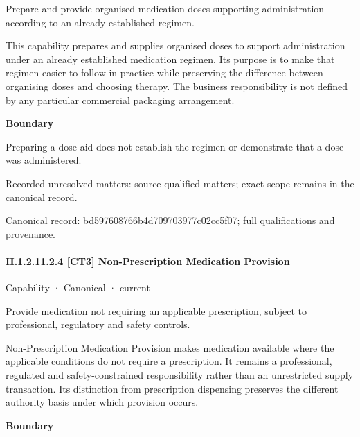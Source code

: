 Prepare and provide organised medication doses supporting administration according to an already established regimen.



This capability prepares and supplies organised doses to support administration under an already established medication regimen. Its purpose is to make that regimen easier to follow in practice while preserving the difference between organising doses and choosing therapy. The business responsibility is not defined by any particular commercial packaging arrangement.



\textbf{Boundary}



Preparing a dose aid does not establish the regimen or demonstrate that a dose was administered.


{\small Recorded unresolved matters: source-qualified matters; exact scope remains in the canonical record.}\par
{\footnotesize \href{../../../../continuum/strategy/capability/bd597608766b4d709703977c02cc5f07.md}{Canonical record: bd597608766b4d709703977c02cc5f07}; full qualifications and provenance.}\par
\paragraph*{II.1.2.11.2.4 [CT3] Non-Prescription Medication Provision}
\label{navigation:II.1.2.11.2.4}

\label{element:7bbe4810fb974a8ab6d47b30d6475df3}
{\small Capability · Canonical · current}\par

Provide medication not requiring an applicable prescription, subject to professional, regulatory and safety controls.



Non-Prescription Medication Provision makes medication available where the applicable conditions do not require a prescription. It remains a professional, regulated and safety-constrained responsibility rather than an unrestricted supply transaction. Its distinction from prescription dispensing preserves the different authority basis under which provision occurs.



\textbf{Boundary}



